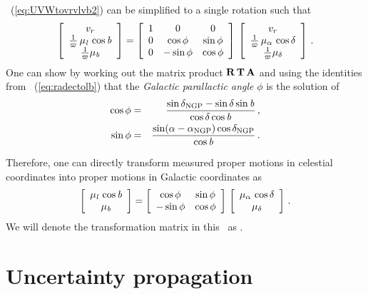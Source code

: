 \eqnnumber~(\ref{eq:UVWtovrvlvb2}) can be simplified to a single
rotation such that
\begin{equation}
\left[ \begin{array}{c} v_r  \\ \frac{1}{\varpi}\,\mu_{\it l}\,\cos{\it b}\\\frac{1}{\varpi}\mu_{\it b}\end{array} \right] = 
\left[ \begin{array}{ccc} 1 & 0 & 0 \\ 0 & \cos \phi & \sin \phi \\ 0 & -\sin\phi & \cos\phi\end{array} \right] \,\left[ \begin{array}{c} v_r  \\ \frac{1}{\varpi}\,\mu_{\alpha}\,\cos\delta\\\frac{1}{\varpi}\mu_{\delta}\end{array} \right]
\, .
\end{equation}
One can show by working out the matrix product $\mathbf{R}\,\mathbf{T}\,\mathbf{A}$ and
using the identities from \eqnnumber~(\ref{eq:radectolb}) that the
\emph{Galactic parallactic angle} $\phi$ is the solution of
\begin{eqnarray}
\cos \phi &=& \frac{\sin \delta_{\textnormal{NGP}} - \sin\delta\sin{\it b}}{\cos\delta\cos{\it b}}\, ,\\
\sin \phi &=& \frac{\sin(\alpha-\alpha_{\textnormal{NGP}} )\cos\delta_{\textnormal{NGP}}}{\cos{\it b}}\, .
\end{eqnarray}

Therefore, one can directly transform measured proper motions in
celestial coordinates into proper motions in Galactic coordinates as
\begin{equation}\label{eq:pmtrans}
\left[ \begin{array}{c} \mu_{\it l}\,\cos{\it b}\\\mu_{\it b}\end{array} \right] = 
\left[ \begin{array}{cc} \cos \phi & \sin \phi \\ -\sin\phi & \cos\phi\end{array} \right] \,\left[ \begin{array}{c} \mu_{\alpha}\,\cos\delta\\\mu_{\delta}\end{array} \right]
\, .
\end{equation}
We will denote the transformation matrix in this \eqnname\ as \PP.


\section{Uncertainty propagation}\label{sec:errorprop}

